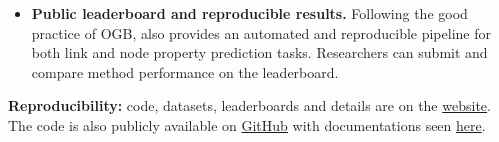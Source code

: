 \begin{itemize}

    \item \textbf{Public leaderboard and reproducible results.} Following the good practice of OGB, \name also provides an automated and reproducible pipeline for both link and node property prediction tasks. Researchers can submit and compare method performance on the \name leaderboard. 
\end{itemize}

\textbf{Reproducibility:} \name code, datasets, leaderboards and details are on the \href{https://tgb.complexdatalab.com/}{\name website}. The code is also publicly available on \href{https://github.com/shenyangHuang/TGB}{GitHub} with documentations seen \href{https://docs.tgb.complexdatalab.com/}{here}.


        


